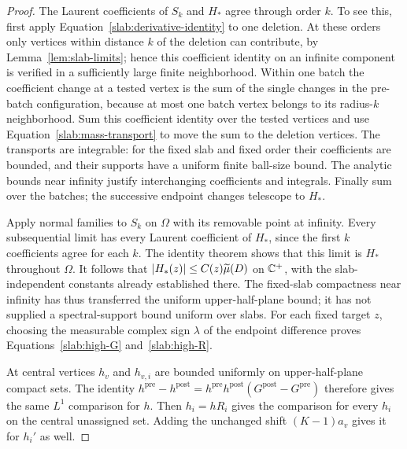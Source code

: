 \begin{proof}
The Laurent coefficients of $S_k$ and $H_*$ agree through order $k$.
To see this, first apply Equation~\eqref{slab:derivative-identity} to
one deletion. At these orders only vertices within distance $k$ of
the deletion can contribute, by Lemma~\ref{lem:slab-limits}; hence
this coefficient identity on an infinite component is verified in a
sufficiently large finite neighborhood. Within one batch the
coefficient change at a tested vertex is the sum of the single
changes in the pre-batch configuration, because at most one batch
vertex belongs to its radius-$k$ neighborhood. Sum this coefficient
identity over the tested vertices and use
Equation~\eqref{slab:mass-transport} to move the sum to the deletion
vertices. The transports are integrable: for the fixed slab and fixed
order their coefficients are bounded, and their supports have a
uniform finite ball-size bound. The analytic bounds near infinity
justify interchanging coefficients and integrals. Finally sum over
the batches; the successive endpoint changes telescope to $H_*$.

Apply normal families to $S_k$ on $\Omega$ with its removable point at
infinity. Every subsequential limit has every Laurent coefficient of
$H_*$, since the first $k$ coefficients agree for each $k$. The identity
theorem shows that this limit is $H_*$ throughout $\Omega$.
It follows that $\left|H_*(z)\right|\leq C(z)\widetilde\mu(D)$ on $\mathbb C^+$,
with the slab-independent constants already established there.
The fixed-slab compactness near infinity has thus transferred the
uniform upper-half-plane bound; it has not supplied a spectral-support
bound uniform over slabs.
For each fixed target $z$, choosing the measurable complex sign
$\lambda$ of the endpoint difference proves
Equations~\eqref{slab:high-G} and~\eqref{slab:high-R}.

At central vertices $h_v$ and $h_{v,i}$ are bounded uniformly on
upper-half-plane compact sets. The identity
$h^{\mathrm{pre}}-h^{\mathrm{post}}
=h^{\mathrm{pre}}h^{\mathrm{post}}(G^{\mathrm{post}}-G^{\mathrm{pre}})$
therefore gives the same $L^1$ comparison for $h$.
Then $h_i=hR_i$ gives the comparison for every $h_i$ on the central
unassigned set. Adding the unchanged shift $(K-1)a_v$ gives it for
$h_i'$ as well.


\end{proof}
